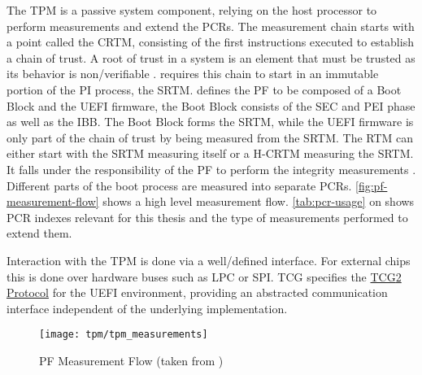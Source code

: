 The \ac{TPM} is a passive system component, relying on the host processor to perform measurements and extend the \acp{PCR}.
The measurement chain starts with a point called the \ac{CRTM}, consisting of the first instructions executed to establish a chain of trust.
A root of trust in a system is an element that must be trusted as its behavior is non\-/verifiable \cite{tcg-tpm-library-part1-architecture}.
\cite[3.2.2]{tcg-pc-client-platform-firmware-profile-spec} requires this chain to start in an immutable portion of the \ac{PI} process, the \ac{SRTM}.
\cite[3.2.3.1]{tcg-pc-client-platform-firmware-profile-spec} defines the \ac{PF} to be composed of a Boot Block and the \ac{UEFI} firmware, the Boot Block consists of the \ac{SEC} and \ac{PEI} phase as well as the \ac{IBB}.
The Boot Block forms the \ac{SRTM}, while the \ac{UEFI} firmware is only part of the chain of trust by being measured from the \ac{SRTM}.
The \ac{RTM} can either start with the \ac{SRTM} measuring itself or a \ac{H-CRTM} measuring the \ac{SRTM}.
It falls under the responsibility of the \ac{PF} to perform the integrity measurements \cite{tcg-pc-client-platform-firmware-profile-spec}.
Different parts of the boot process are measured into separate \acp{PCR}.
\autoref{fig:pf-measurement-flow} shows a high level measurement flow.
\autoref{tab:pcr-usage} on \pageref{tab:pcr-usage} shows \ac{PCR} indexes relevant for this thesis and the type of measurements performed to extend them.

Interaction with the \ac{TPM} is done via a well\-/defined interface.
For external chips this is done over hardware buses such as \ac{LPC} or \ac{SPI}.
\ac{TCG} specifies the \hyperref[lst:tcg2-protocol]{\ac{TCG}2 Protocol} for the \ac{UEFI} environment, providing an abstracted communication interface independent of the underlying implementation.

\begin{figure}[htb]
    \centering
    \texttt{[image: tpm/tpm\_measurements]}
    \caption[\acs{PF} Measurement Flow]{\acs{PF} Measurement Flow (taken from \cite[Figure 3]{tianocore-trusted-boot-chain})}
    \label{fig:pf-measurement-flow}
\end{figure}

